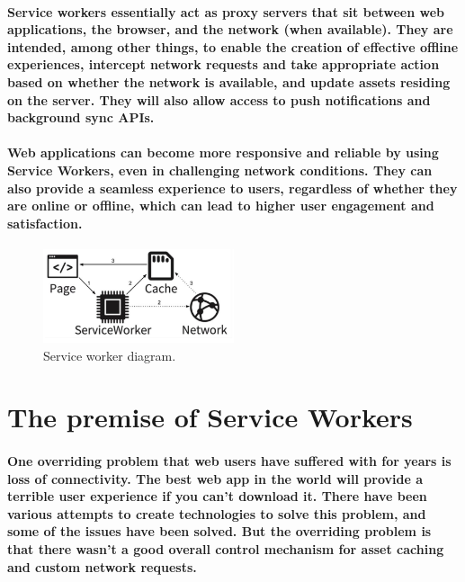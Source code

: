 \documentclass[12pt,a4paper]{article}
\begin{document}
    \paragraph{Service workers essentially act as proxy servers that sit between web
    applications, the browser, and the network (when available). They are intended,
    among other things, to enable the creation of effective offline experiences, intercept
    network requests and take appropriate action based on whether the network is
    available, and update assets residing on the server. They will also allow access to
    push notifications and background sync APIs.}

    \paragraph{Web applications can become more responsive and reliable by using Service
    Workers, even in challenging network conditions. They can also provide a seamless
    experience to users, regardless of whether they are online or offline, which can lead
    to higher user engagement and satisfaction.}

    \begin{figure}[h!]
      \centering
      \includegraphics[width=0.5\textwidth]{diagram.png}
      \caption{Service worker diagram.}
    \end{figure}

    \section{The premise of Service Workers}

    \paragraph{One overriding problem that web users have suffered with for years is loss of
    connectivity. The best web app in the world will provide a terrible user experience if
    you can't download it. There have been various attempts to create technologies to
    solve this problem, and some of the issues have been solved. But the overriding
    problem is that there wasn't a good overall control mechanism for asset caching and
    custom network requests.}
    
\end{document}
